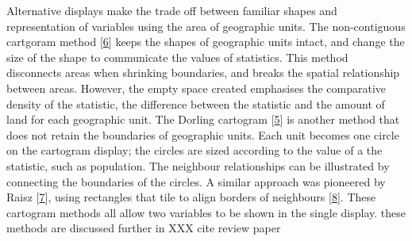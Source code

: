 \documentclass[conference,final,]{IEEEtran}
\begin{document}
Alternative displays make the trade off between familiar shapes and representation of variables using the area of geographic units. The non-contiguous cartgoram method {[}\protect\hyperlink{ref-NAC}{6}{]} keeps the shapes of geographic units intact, and change the size of the shape to communicate the values of statistics. This method disconnects areas when shrinking boundaries, and breaks the spatial relationship between areas. However, the empty space created emphasises the comparative density of the statistic, the difference between the statistic and the amount of land for each geographic unit.
The Dorling cartogram {[}\protect\hyperlink{ref-ACTUC}{5}{]} is another method that does not retain the boundaries of geographic units. Each unit becomes one circle on the cartogram display; the circles are sized according to the value of a the statistic, such as population. The neighbour relationships can be illustrated by connecting the boundaries of the circles. A similar approach was pioneered by Raisz {[}\protect\hyperlink{ref-RSCW}{7}{]}, using rectangles that tile to align borders of neighbours {[}\protect\hyperlink{ref-CDWCS}{8}{]}.
These cartogram methods all allow two variables to be shown in the single display. these methods are discussed further in XXX cite review paper
\end{document}
